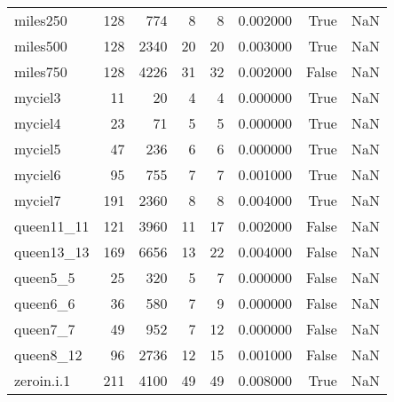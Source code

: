 \begin{tabular}{lrrrrrrr}
miles250 & 128 & 774 & 8 & 8 & 0.002000 & True & NaN \\
miles500 & 128 & 2340 & 20 & 20 & 0.003000 & True & NaN \\
miles750 & 128 & 4226 & 31 & 32 & 0.002000 & False & NaN \\
myciel3 & 11 & 20 & 4 & 4 & 0.000000 & True & NaN \\
myciel4 & 23 & 71 & 5 & 5 & 0.000000 & True & NaN \\
myciel5 & 47 & 236 & 6 & 6 & 0.000000 & True & NaN \\
myciel6 & 95 & 755 & 7 & 7 & 0.001000 & True & NaN \\
myciel7 & 191 & 2360 & 8 & 8 & 0.004000 & True & NaN \\
queen11_11 & 121 & 3960 & 11 & 17 & 0.002000 & False & NaN \\
queen13_13 & 169 & 6656 & 13 & 22 & 0.004000 & False & NaN \\
queen5_5 & 25 & 320 & 5 & 7 & 0.000000 & False & NaN \\
queen6_6 & 36 & 580 & 7 & 9 & 0.000000 & False & NaN \\
queen7_7 & 49 & 952 & 7 & 12 & 0.000000 & False & NaN \\
queen8_12 & 96 & 2736 & 12 & 15 & 0.001000 & False & NaN \\
zeroin.i.1 & 211 & 4100 & 49 & 49 & 0.008000 & True & NaN \\
\bottomrule
\end{tabular}
